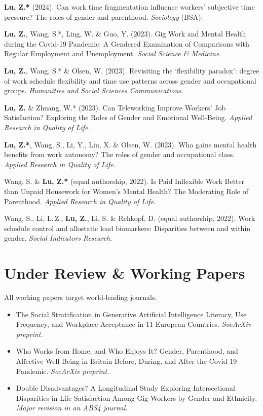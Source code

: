 \documentclass[11pt,a4paper]{article}
\begin{document}
\begin{enumerate}[label={[\arabic*]}]
\item \textbf{Lu, Z.*} (2024). Can work time fragmentation influence workers' subjective time pressure? The roles of gender and parenthood. \textit{Sociology} (BSA).

\item \textbf{Lu, Z.}, Wang, S.*, Ling, W. \& Guo, Y. (2023). Gig Work and Mental Health during the Covid-19 Pandemic: A Gendered Examination of Comparisons with Regular Employment and Unemployment. \textit{Social Science \& Medicine}.

\item \textbf{Lu, Z.}, Wang, S.* \& Olsen, W. (2023). Revisiting the `flexibility paradox': degree of work schedule flexibility and time use patterns across gender and occupational groups. \textit{Humanities and Social Sciences Communications}.

\item \textbf{Lu, Z.} \& Zhuang, W.* (2023). Can Teleworking Improve Workers' Job Satisfaction? Exploring the Roles of Gender and Emotional Well-Being. \textit{Applied Research in Quality of Life}.

\item \textbf{Lu, Z.*}, Wang, S., Li, Y., Liu, X. \& Olsen, W. (2023). Who gains mental health benefits from work autonomy? The roles of gender and occupational class. \textit{Applied Research in Quality of Life}.

\item Wang, S. \& \textbf{Lu, Z.*} (equal authorship, 2022). Is Paid Inflexible Work Better than Unpaid Housework for Women's Mental Health? The Moderating Role of Parenthood. \textit{Applied Research in Quality of Life}.

\item Wang, S., Li, L.\,Z., \textbf{Lu, Z.}, Li, S. \& Rehkopf, D. (equal authorship, 2022). Work schedule control and allostatic load biomarkers: Disparities between and within gender. \textit{Social Indicators Research}.
\end{enumerate}

\section*{Under Review \& Working Papers}
All working papers target world-leading journals.
\begin{itemize}
\item The Social Stratification in Generative Artificial Intelligence Literacy, Use Frequency, and Workplace Acceptance in 11 European Countries. \textit{SocArXiv preprint.}
\item Who Works from Home, and Who Enjoys It? Gender, Parenthood, and Affective Well-Being in Britain Before, During, and After the Covid-19 Pandemic. \textit{SocArXiv preprint.}
\item Double Disadvantages? A Longitudinal Study Exploring Intersectional Disparities in Life Satisfaction Among Gig Workers by Gender and Ethnicity. \textit{Major revision in an ABS4 journal.}
\end{itemize}
\end{document}
